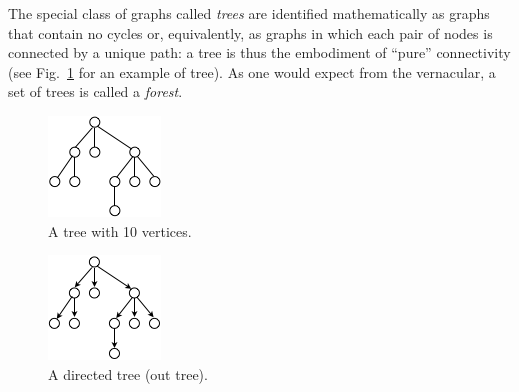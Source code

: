 The special class of graphs called {\it trees} 
 are identified mathematically as graphs that contain no
cycles or, equivalently, as graphs in which each pair of nodes is
connected by a unique path: a tree is thus the embodiment of ``pure''
connectivity (see Fig.~\ref{fig:tree} for an example of tree).  As one
would expect from the vernacular, a set of trees is called a {\it
  forest}. 

\begin{figure}[hbt]
\begin{center}
       \includegraphics[scale=0.7]{FiguresGraph/tree}
       \caption{A tree with 10 vertices.}
  \label{fig:tree}
\end{center}
\end{figure}

\begin{figure}[hbt]
\begin{center}
       \includegraphics[scale=0.7]{FiguresGraph/outtree}
       \caption{A directed tree (out tree).}
  \label{fig:outtree}
\end{center}
\end{figure}


